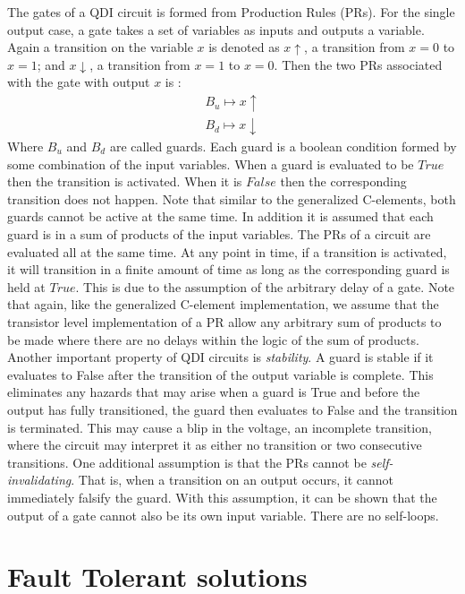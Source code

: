 \documentclass[12pt]{report}
\begin{document}
The gates of a QDI circuit is formed from Production Rules (PRs).  For the single output case, a gate takes a set of variables as inputs and outputs a variable.  Again a transition on the variable $x$ is denoted as $x\uparrow$, a transition from $x=0$ to $x=1$; and $x\downarrow$, a transition from $x=1$ to $x=0$.  Then the two PRs associated with the gate with output $x$ is :
\begin{align*}
   B_u\mapsto x\uparrow \\
   B_d\mapsto x\downarrow 
\end{align*}
Where $B_u$ and $B_d$ are called guards.  Each guard is a boolean condition formed by some combination of the input variables.  When a guard is evaluated to be $True$ then the transition is activated.  When it is $False$ then the corresponding transition does not happen.  Note that similar to the generalized C-elements, both guards cannot be active at the same time.  In addition it is assumed that each guard is in a sum of products of the input variables.  The PRs of a circuit are evaluated all at the same time.  At any point in time, if a transition is activated, it will transition in a finite amount of time as long as the corresponding guard is held at $True$.  This is due to the assumption of the arbitrary delay of a gate.  Note that again, like the generalized C-element implementation, we assume that the transistor level implementation of a PR allow any arbitrary sum of products to be made where there are no delays within the logic of the sum of products.\\

Another important property of QDI circuits is \textit{stability}.  A guard is stable if it evaluates to False after the transition of the output variable is complete.  This eliminates any hazards that may arise when a guard is True and before the output has fully transitioned, the guard then evaluates to False and the transition is terminated.  This may cause a blip in the voltage, an incomplete transition, where the circuit may interpret it as either no transition or two consecutive transitions.  One additional assumption is that the PRs cannot be \textit{self-invalidating}.  That is, when a transition on an output occurs, it cannot immediately falsify the guard.  With this assumption, it can be shown that the output of a gate cannot also be its own input variable.  There are no self-loops.  

\section{Fault Tolerant solutions}
\end{document}
